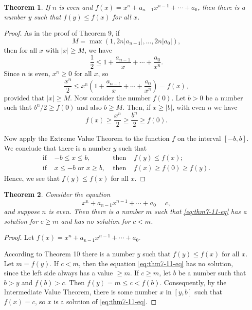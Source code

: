 \documentclass{article}
\numberwithin{corollary}{subsection}
\numberwithin{definition}{subsection}
\numberwithin{lemma}{subsection}
\newtheorem{theorem}{Theorem}
\numberwithin{theorem}{subsection}
\begin{document}
\begin{theorem}
  If $n$ is even and $f(x) = x^n + a_{n-1}x^{n-1} + \cdots + a_0$, then there
  is a number $y$ such that $f(y) \leq f(x)$ for all $x$.
\end{theorem}
\begin{proof}
  As in the proof of Theorem 9, if \[
    M = \max(1, 2n|a_{n-1}|, \ldots, 2n|a_0|),
  \] then for all $x$ with $|x| \geq M$, we have \[
    \frac{1}{2} \leq 1 + \frac{a_{n-1}}{x} + \cdots + \frac{a_0}{x^n}.
  \] Since $n$ is even, $x^n \geq 0$ for all $x$, so \[
    \frac{x^n}{2}
    \leq x^n \left(1 + \frac{a_{n-1}}{x} + \cdots + \frac{a_0}{x^n}\right)
    = f(x),
  \] provided that $|x| \geq M$. Now consider the number $f(0)$. Let $b > 0$ be
  a number such that $b^n/2 \geq f(0)$ and also $b \geq M$. Then, if $x \geq
  |b|$, with even $n$ we have \[
    f(x) \geq \frac{x^n}{2} \geq \frac{b^n}{2} \geq f(0).
  \]

  Now apply the Extreme Value Theorem to the function $f$ on the interval $[-b,
  b]$. We conclude that there is a number $y$ such that
  \begin{align*}
    \text{if } &-b \leq x \leq b, &\text{ then } &f(y) \leq f(x); \\
    \text{if } &x \leq -b \text{ or } x \geq b, &\text{ then } &f(x) \geq f(0)
      \geq f(y).
  \end{align*}
  Hence, we see that $f(y) \leq f(x)$ for all $x$.
\end{proof}

\begin{theorem}
  Consider the equation \[
    \label{eq:thm7-11-eq} \tag{*}
    x^n + a_{n-1}x^{n-1} + \cdots + a_0 = c, 
  \] and suppose $n$ is even. Then there is a number $m$ such that
  \eqref{eq:thm7-11-eq} has a solution for $c \geq m$ and has no solution for $c
  < m$.
\end{theorem}
\begin{proof}
  Let $f(x) = x^n + a_{n-1}x^{n-1} + \cdots + a_0$.

  According to Theorem 10 there is a number $y$ such that $f(y) \leq f(x)$ for
  all $x$. Let $m = f(y)$. If $c < m$, then the equation
  \eqref{eq:thm7-11-eq} has no solution, since the left side always has a
  value $\geq m$. If $c \geq m$, let $b$ be a number such that $b > y$ and
  $f(b) > c$. Then $f(y) = m \leq c < f(b)$. Consequently, by the Intermediate
  Value Theorem, there is some number $x$ in $[y, b]$ such that $f(x) = c$, so
  $x$ is a solution of \eqref{eq:thm7-11-eq}.
\end{proof}
\end{document}
